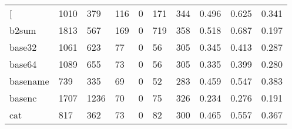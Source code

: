 \begin{longtable}{lp{1.3cm}p{1.3cm}p{1.3cm}p{1.3cm}p{1.3cm}p{1.3cm}p{1.3cm}p{1.3cm}p{1.3cm}}
\bottomrule
\endlastfoot
{[}         &                   1010 &                                379 &                               116 &                                0 &                               171 &                             344 &                                0.496 &                                  0.625 &                                0.341 \\
b2sum     &                   1813 &                                567 &                               169 &                                0 &                               719 &                             358 &                                0.518 &                                  0.687 &                                0.197 \\
base32    &                   1061 &                                623 &                                77 &                                0 &                                56 &                             305 &                                0.345 &                                  0.413 &                                0.287 \\
base64    &                   1089 &                                655 &                                73 &                                0 &                                56 &                             305 &                                0.335 &                                  0.399 &                                0.280 \\
basename  &                    739 &                                335 &                                69 &                                0 &                                52 &                             283 &                                0.459 &                                  0.547 &                                0.383 \\
basenc    &                   1707 &                               1236 &                                70 &                                0 &                                75 &                             326 &                                0.234 &                                  0.276 &                                0.191 \\
cat       &                    817 &                                362 &                                73 &                                0 &                                82 &                             300 &                                0.465 &                                  0.557 &                                0.367 \\

\end{longtable}
